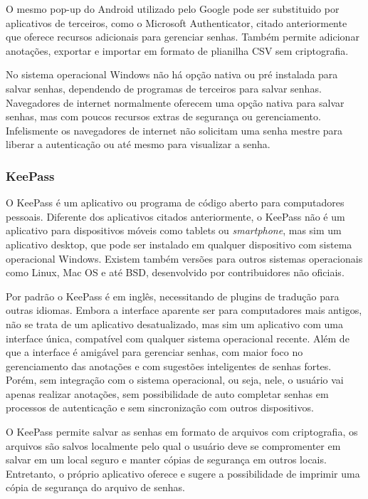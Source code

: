 \documentclass[12pt]{article}
\begin{document}
O mesmo pop-up do Android utilizado pelo Google pode ser substituido por
aplicativos de terceiros, como o Microsoft Authenticator, citado anteriormente
que oferece recursos adicionais para gerenciar senhas.
Também permite adicionar anotações, exportar e importar em formato de plianilha
CSV sem criptografia.

No sistema operacional Windows não há opção nativa ou pré instalada para
salvar senhas, dependendo de programas de terceiros para salvar senhas.
Navegadores de internet normalmente oferecem uma opção nativa para salvar senhas,
mas com poucos recursos extras de segurança ou gerenciamento.
Infelismente os navegadores de internet não solicitam uma senha mestre para liberar
a autenticação ou até mesmo para visualizar a senha.

\subsubsection{KeePass}

O KeePass é um aplicativo ou programa de código aberto para computadores pessoais.
Diferente dos aplicativos citados anteriormente, o KeePass não é um aplicativo
para dispositivos móveis como tablets ou \textit{smartphone}, mas sim um aplicativo desktop,
que pode ser instalado em qualquer dispositivo com sistema operacional Windows.
Existem também versões para outros sistemas operacionais como Linux, Mac OS e até
BSD, desenvolvido por contribuidores não oficiais.

Por padrão o KeePass é em inglês, necessitando de plugins de tradução para outras
idiomas.
Embora a interface aparente ser para computadores mais antigos, não se trata de um
aplicativo desatualizado, mas sim um aplicativo com uma interface única, compatível
com qualquer sistema operacional recente.
Além de que a interface é amigável para gerenciar senhas, com maior foco no gerenciamento
das anotações e com sugestões inteligentes de senhas fortes.
Porém, sem integração com o sistema operacional, ou seja, nele, o usuário vai apenas
realizar anotações, sem possibilidade de auto completar senhas em processos de autenticação
e sem sincronização com outros dispositivos.

O KeePass permite salvar as senhas em formato de arquivos com criptografia, os arquivos
são salvos localmente pelo qual o usuário deve se compromenter em salvar em um local
seguro e manter cópias de segurança em outros locais.
Entretanto, o próprio aplicativo oferece e sugere a possibilidade de imprimir uma cópia
de segurança do arquivo de senhas.
\end{document}
